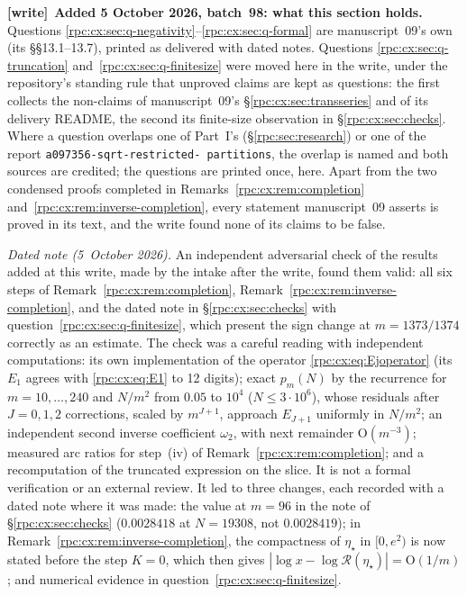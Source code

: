 \documentclass[11pt]{article}
\theoremstyle{definition}
\theoremstyle{remark}
\numberwithin{equation}{section}
\newenvironment{writenote}[1][]{\par\smallskip\begingroup\small
 \noindent\textbf{[write]}\if\relax\detokenize{#1}\relax\else~\textbf{#1.}\fi\ }%
 {\par\endgroup\smallskip}
\begin{document}
\begin{writenote}[Added 5 October 2026, batch~98: what this section holds]
Questions \ref{rpc:cx:sec:q-negativity}--\ref{rpc:cx:sec:q-formal} are
manuscript~09's own (its \S\S13.1--13.7), printed as delivered with dated
notes. Questions \ref{rpc:cx:sec:q-truncation} and~\ref{rpc:cx:sec:q-finitesize}
were moved here in the write, under the repository's standing rule that
unproved claims are kept as questions: the first collects the non-claims of
manuscript~09's \S\ref{rpc:cx:sec:transseries} and of its delivery README,
the second its finite-size observation in \S\ref{rpc:cx:sec:checks}. Where a question
overlaps one of Part~I's (\S\ref{rpc:sec:research}) or one of the report
\texttt{a097356-\allowbreak sqrt-\allowbreak restricted-\allowbreak
partitions}, the overlap is named and both sources are credited; the
questions are printed once, here. Apart from the two condensed proofs
completed in Remarks~\ref{rpc:cx:rem:completion}
and~\ref{rpc:cx:rem:inverse-completion}, every statement manuscript~09
asserts is proved in its text, and the write found none of its claims to be
false.

\emph{Dated note (5~October 2026).} An independent adversarial check of
the results added at this write, made by the intake after the write, found
them valid: all six steps of Remark~\ref{rpc:cx:rem:completion},
Remark~\ref{rpc:cx:rem:inverse-completion}, and the dated note in
\S\ref{rpc:cx:sec:checks} with question~\ref{rpc:cx:sec:q-finitesize},
which present the sign change at $m=1373/1374$ correctly as an estimate.
The check was a careful reading with independent computations: its own
implementation of the operator \eqref{rpc:cx:eq:Ejoperator} (its $E_1$
agrees with \eqref{rpc:cx:eq:E1} to 12 digits); exact $p_m(N)$ by the
recurrence for $m=10,\ldots,240$ and $N/m^2$ from $0.05$ to $10^4$
($N\le3\cdot10^6$), whose residuals after $J=0,1,2$ corrections, scaled by
$m^{J+1}$, approach $E_{J+1}$ uniformly in $N/m^2$; an independent
second inverse coefficient $\omega_2$, with next remainder
$\mathrm O(m^{-3})$; measured arc ratios for step~(iv) of
Remark~\ref{rpc:cx:rem:completion}; and a recomputation of the truncated
expression on the slice. It is not a formal verification or an external
review. It led to three changes, each recorded with a dated note where it
was made: the value at $m=96$ in the note of \S\ref{rpc:cx:sec:checks}
($0.0028418$ at $N=19308$, not $0.0028419$); in
Remark~\ref{rpc:cx:rem:inverse-completion}, the compactness of
$\eta_\star$ in $[0,e^2)$ is now stated before the step $K=0$, which then
gives $|\log x-\log\mathcal R(\eta_\star)|=\mathrm O(1/m)$; and numerical
evidence in question~\ref{rpc:cx:sec:q-finitesize}.
\end{writenote}
\end{document}
